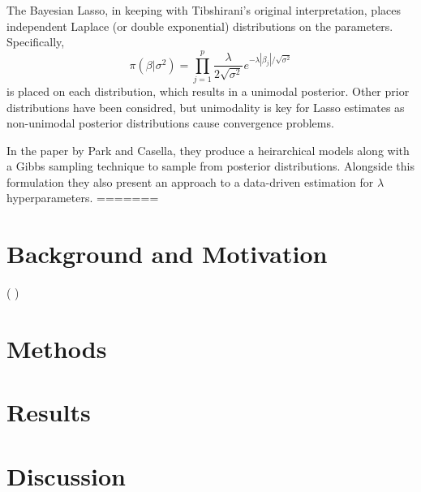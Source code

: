 \documentclass{uwstat572}
\newcommand{\vmcomment}[1]{({\color{blue}{VM's comment:}} \textbf{\color{blue}{#1}})}
\begin{document}
The Bayesian Lasso, in keeping with Tibshirani's original interpretation, places independent Laplace (or double exponential) distributions on the parameters. Specifically, \[
\pi(\beta|\sigma^2)=\prod_{j=1}^p\frac{\lambda}{2\sqrt{\sigma^2}}e^{-\lambda |\beta_j|/\sqrt{\sigma^2}}
\] is placed on each distribution, which results in a unimodal posterior. Other prior distributions have been considred, but unimodality is key for Lasso estimates as non-unimodal posterior distributions cause convergence problems.

In the paper by Park and Casella, they produce a heirarchical models along with a Gibbs sampling technique to sample from posterior distributions. Alongside this formulation they also present an approach to a data-driven estimation for $\lambda$ hyperparameters.\cite{park2008bayesian}
=======
\section{Background and Motivation}
\vmcomment{I don't think you need a separate Background section; make it a Methods subsection if needed}

\section{Methods}

\section{Results}

\section{Discussion}


\end{document}
